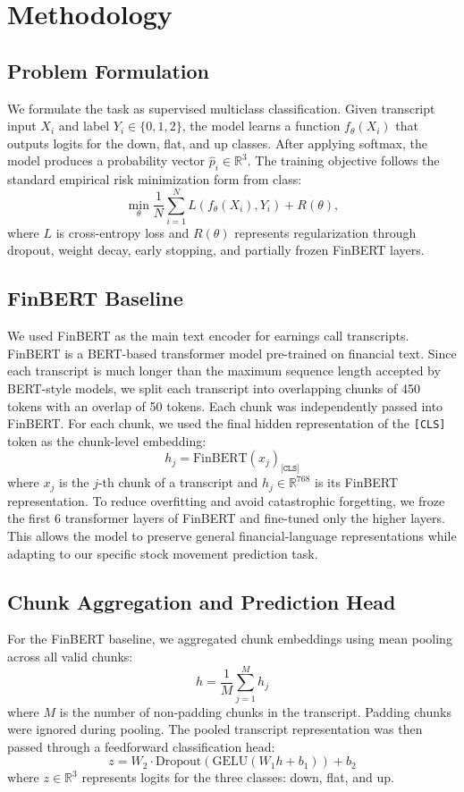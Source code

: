 \documentclass[11pt]{article}
\begin{document}
\section{Methodology}

\subsection{Problem Formulation}

We formulate the task as supervised multiclass classification. Given transcript input $X_i$ and label $Y_i \in \{0,1,2\}$, the model learns a function $f_\theta(X_i)$ that outputs logits for the down, flat, and up classes. After applying softmax, the model produces a probability vector $\hat{p}_i \in \mathbb{R}^3$. The training objective follows the standard empirical risk minimization form from class:
\[
\min_{\theta} \frac{1}{N}\sum_{i=1}^{N} L(f_\theta(X_i),Y_i) + R(\theta),
\]
where $L$ is cross-entropy loss and $R(\theta)$ represents regularization through dropout, weight decay, early stopping, and partially frozen FinBERT layers.

\subsection{FinBERT Baseline}
We used FinBERT as the main text encoder for earnings call transcripts. FinBERT is a BERT-based transformer model pre-trained on financial text.
Since each transcript is much longer than the maximum sequence length accepted by BERT-style models, we split each transcript into overlapping chunks of 450 tokens with an overlap of 50 tokens. Each chunk was independently passed into FinBERT. For each chunk, we used the final hidden representation of the \texttt{[CLS]} token as the chunk-level embedding:
\[
h_j = \mathrm{FinBERT}(x_j)_{\texttt{[CLS]}}
\]
where \(x_j\) is the \(j\)-th chunk of a transcript and \(h_j \in \mathbb{R}^{768}\) is its FinBERT representation.
To reduce overfitting and avoid catastrophic forgetting, we froze the first 6 transformer layers of FinBERT and fine-tuned only the higher layers. This allows the model to preserve general financial-language representations while adapting to our specific stock movement prediction task.
\subsection{Chunk Aggregation and Prediction Head}
For the FinBERT baseline, we aggregated chunk embeddings using mean pooling across all valid chunks:
\[
h = \frac{1}{M} \sum_{j=1}^{M} h_j
\]
where \(M\) is the number of non-padding chunks in the transcript. Padding chunks were ignored during pooling.
The pooled transcript representation was then passed through a feedforward classification head:
\[
z = W_2 \cdot \mathrm{Dropout}(\mathrm{GELU}(W_1 h + b_1)) + b_2
\]
where \(z \in \mathbb{R}^{3}\) represents logits for the three classes: down, flat, and up.
\end{document}
